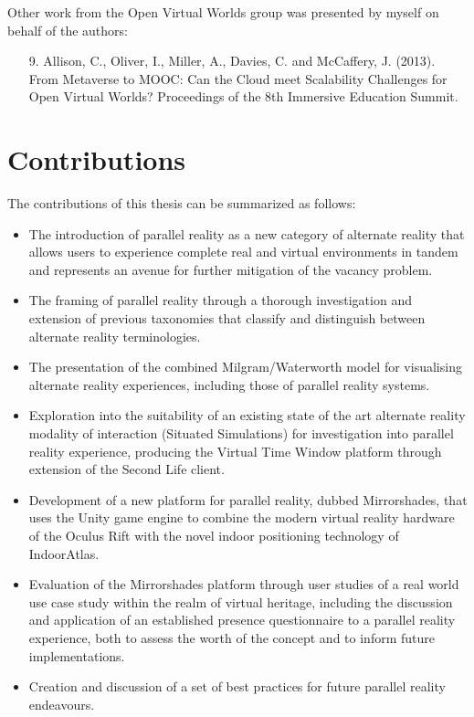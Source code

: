
Other work from the Open Virtual Worlds group was presented by myself on behalf of the authors:

\begin{itemize}
	
	\item [9.] Allison, C., Oliver, I., Miller, A., Davies, C. and McCaffery, J. (2013). From Metaverse to MOOC: Can the Cloud meet Scalability Challenges for Open Virtual Worlds? Proceedings of the 8th Immersive Education Summit.
	
\end{itemize}



\section{Contributions}
\label{intro-contributions}
The contributions of this thesis can be summarized as follows:

\begin{itemize}
	\item The introduction of parallel reality as a new category of alternate reality that allows users to experience complete real and virtual environments in tandem and represents an avenue for further mitigation of the vacancy problem.
	\item The framing of parallel reality through a thorough investigation and extension of previous taxonomies that classify and distinguish between alternate reality terminologies.
	\item The presentation of the combined Milgram/Waterworth model for visualising alternate reality experiences, including those of parallel reality systems.
	\item Exploration into the suitability of an existing state of the art alternate reality modality of interaction (Situated Simulations) for investigation into parallel reality experience, producing the Virtual Time Window platform through extension of the Second Life client.
	\item Development of a new platform for parallel reality, dubbed Mirrorshades, that uses the Unity game engine to combine the modern virtual reality hardware of the Oculus Rift with the novel indoor positioning technology of IndoorAtlas.
	\item Evaluation of the Mirrorshades platform through user studies of a real world use case study within the realm of virtual heritage, including the discussion and application of an established presence questionnaire to a parallel reality experience, both to assess the worth of the concept and to inform future implementations.
	\item Creation and discussion of a set of best practices for future parallel reality endeavours.
\end{itemize}

